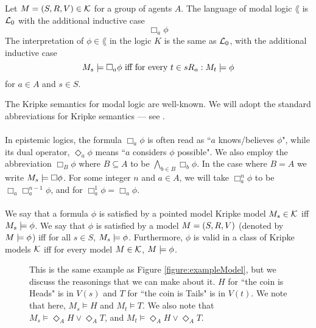\begin{defn} \label{modalLogic}
Let $M = (S, R, V) \in \mathcal{K}$ for a group of agents $A$.
The language of modal logic $\lang$ is $\mathcal{L}_0$ with the additional inductive case
\[
	 \Box_a \phi
\]
The interpretation of $\phi \in \lang$ in the logic $K$ is the same as $\mathcal{L}_0$, with the
additional inductive case
\[
	M_s \models \Box_a \phi \text{ iff for every }t \in s R_a: M_t \models \phi
\]
for $a \in A$ and $s \in S$.
\end{defn}
The Kripke semantics for modal logic are well-known.
We will adopt the standard abbreviations for Kripke semantics --- see \cite{blackburn2002modal}.\\
\\
In epistemic logics, the formula $\Box_a \phi$ is often read as ``$a$ knows/believes $\phi$", while
its dual operator, $\Diamond_a \phi$ means ``$a$ considers $\phi$ possible".
We also employ the abbreviation $\Box_B \phi$ where $B \subseteq A$ to be $\bigwedge_{b \in B}
\Box_b \phi$.
In the case where $B = A$ we write $M_s \models \Box \phi$.
For some integer $n$ and $a \in A$, we will take $\Box^n_a \phi$ to be $\Box_a \Box^{n-1}_a \phi$,
and for $\Box^1_a \phi = \Box_a \phi$.\\
\\
We say that a formula $\phi$ is satisfied by a pointed model Kripke model $M_s \in \mathcal{K}$ iff
$M_s \models \phi$.
We say that $\phi$ is satisfied by a model $M = (S, R, V)$ (denoted by
    $M \models \phi$) iff
for all $s \in S$, $M_s \models \phi$.
Furthermore, $\phi$ is valid in a class of Kripke models $\mathcal{K}$ iff for
every model $M \in
\mathcal{K}$, $M \models \phi$.

\begin{figure}
\centering
{}
\caption{This is the same example as Figure \ref{figure:exampleModel}, but we discuss the reasonings
that we can make about it.
$H$ for ``the coin is Heads" is in $V(s)$ and $T$ for ``the coin is Tails" is in $V(t)$.
We note that here, $M_s \models H$ and $M_t \models T$.
We also note that $M_s \models \Diamond_A H \lor \Diamond_A T$, and $M_t \models \Diamond_A H \lor
\Diamond_A T$.}
\label{figure:exampleReasonings}
\end{figure}

